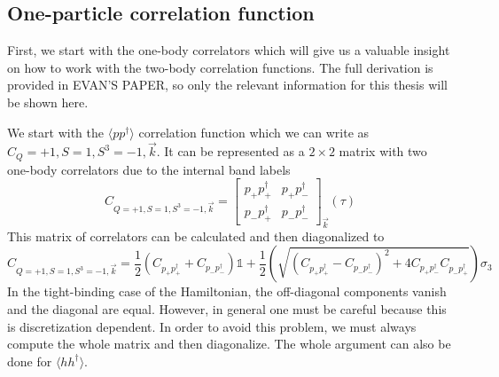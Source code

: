 \subsection{One-particle correlation function}

First, we start with the one-body correlators which will give us a valuable insight on how to work with the two-body correlation functions. The full derivation is provided in EVAN'S PAPER, so only the relevant information for this thesis will be shown here.

We start with the $\langle pp^\dagger \rangle$ correlation function which we can write as $C_Q=+1,S=1,S^3=-1,\vec{k}$. It can be represented as a $2\times 2$ matrix with two one-body correlators due to the internal band labels
\newcommand{\corp}[2]{p_{#1}p^\dagger_{#2}}
\begin{equation}
  C_{Q=+1,S=1,S^3=-1,\vec{k}} =
  \left[
  \begin{array}{cc}
    \corp{+}{+} & \corp{+}{-} \\
    \corp{-}{+} & \corp{-}{-}
  \end{array}
  \right] _{\vec{k}} (\tau)
\end{equation}
This matrix of correlators can be calculated and then diagonalized to
\begin{equation}
  C_{Q=+1,S=1,S^3=-1,\vec{k}} = \frac{1}{2}\left(C_{\corp{+}{+}} + C_{\corp{-}{-}}\right)\mathds{1} + \frac{1}{2}\left(\sqrt{\left(C_{\corp{+}{+}} - C_{\corp{-}{-}}\right)^2 + 4 C_{\corp{+}{-}}C_{\corp{-}{+}}}\right)\sigma_3
\end{equation}
In the tight-binding case of the Hamiltonian, the off-diagonal components vanish and the diagonal are equal. However, in general one must be careful because this is discretization dependent. In order to avoid this problem, we must always compute the whole matrix and then diagonalize. The whole argument can also be done for $\langle hh^\dagger\rangle$.

